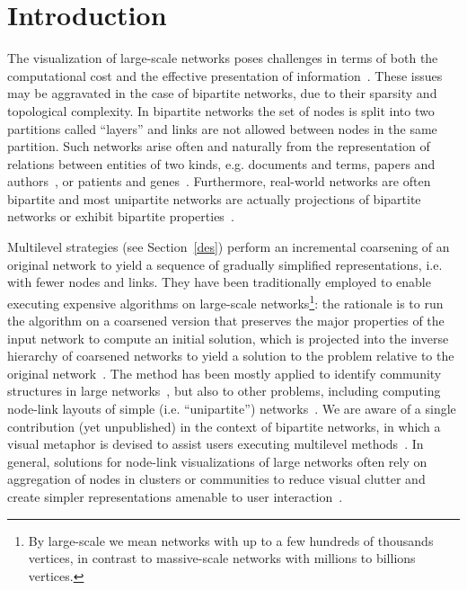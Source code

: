 \documentclass[runningheads]{llncs}
\begin{document}
\section{Introduction}
The visualization of large-scale networks poses challenges in terms of both the computational cost and the effective presentation of information~\cite{tang,staudt}.
These issues may be aggravated in the case of bipartite networks,
due to their sparsity and topological complexity.
In bipartite networks the set of nodes is split into two partitions called ``layers''
and links are not allowed between nodes in the same partition.
Such networks arise often and naturally from the representation
of relations between entities of two kinds,
e.g. documents and terms, papers and authors~\cite{doc,sci,movie}, or patients and genes~\cite{gene}.
Furthermore, real-world networks are often bipartite and most unipartite networks are actually projections of bipartite networks or exhibit bipartite properties~\cite{guillaume0,guillaume}.

Multilevel strategies (see Section~\ref{des}) perform an incremental coarsening of an original
network to yield a sequence of gradually simplified representations, i.e. with fewer nodes and links.
They have been traditionally employed to enable executing expensive algorithms
on large-scale networks\footnote{By large-scale we mean networks with up to a few hundreds of thousands vertices, in contrast to massive-scale networks with  millions to billions vertices.}: the rationale is to run the algorithm on a coarsened
version that preserves the major properties of the input network to compute an initial solution, which is projected into the inverse hierarchy of coarsened networks  to yield a solution to the problem relative to the original network~\cite{alan2,ml2}. 
The method has been mostly applied to identify community structures in large networks~\cite{Pope2017}, but also to other problems, including computing node-link layouts of simple (i.e. ``unipartite'') networks~\cite{u1,u2,u3,u4,u5,u6,u7,u8,u9,u10}. We are aware of a single contribution (yet unpublished) in the context of bipartite networks, in which a visual metaphor is devised to assist users executing multilevel methods~\cite{cintra2019}. In general, solutions for node-link visualizations of large networks often rely on aggregation of nodes in clusters or communities to reduce visual clutter and create simpler representations amenable to user interaction~\cite{a1,a2,a3,a4,a5,a6}. 
\end{document}
